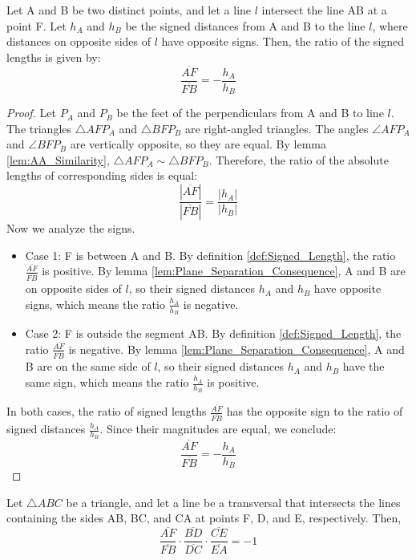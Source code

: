\begin{lemma}
    \label{lem:Segment_Ratio_by_Signed_Perpendiculars}
    Let A and B be two distinct points, and let a line $l$ intersect the line AB at a point F. Let $h_A$ and $h_B$ be the signed distances from A and B to the line $l$, where distances on opposite sides of $l$ have opposite signs. Then, the ratio of the signed lengths is given by:
    $$ \frac{\overline{AF}}{\overline{FB}} = -\frac{h_A}{h_B} $$
\end{lemma}

\begin{proof}
    Let $P_A$ and $P_B$ be the feet of the perpendiculars from A and B to line $l$. The triangles $\triangle AFP_A$ and $\triangle BFP_B$ are right-angled triangles. The angles $\angle AFP_A$ and $\angle BFP_B$ are vertically opposite, so they are equal. By lemma \ref{lem:AA_Similarity}, $\triangle AFP_A \sim \triangle BFP_B$. Therefore, the ratio of the absolute lengths of corresponding sides is equal:
    $$ \frac{|\overline{AF}|}{|\overline{FB}|} = \frac{|h_A|}{|h_B|} $$
    Now we analyze the signs.
    \begin{itemize}
        \item Case 1: F is between A and B. By definition \ref{def:Signed_Length}, the ratio $\frac{\overline{AF}}{\overline{FB}}$ is positive. By lemma \ref{lem:Plane_Separation_Consequence}, A and B are on opposite sides of $l$, so their signed distances $h_A$ and $h_B$ have opposite signs, which means the ratio $\frac{h_A}{h_B}$ is negative.
        \item Case 2: F is outside the segment AB. By definition \ref{def:Signed_Length}, the ratio $\frac{\overline{AF}}{\overline{FB}}$ is negative. By lemma \ref{lem:Plane_Separation_Consequence}, A and B are on the same side of $l$, so their signed distances $h_A$ and $h_B$ have the same sign, which means the ratio $\frac{h_A}{h_B}$ is positive.
    \end{itemize}
    In both cases, the ratio of signed lengths $\frac{\overline{AF}}{\overline{FB}}$ has the opposite sign to the ratio of signed distances $\frac{h_A}{h_B}$. Since their magnitudes are equal, we conclude:
    $$ \frac{\overline{AF}}{\overline{FB}} = -\frac{h_A}{h_B} $$
\end{proof}

\begin{theorem}
    \label{thm:Menelaus}
    Let $\triangle ABC$ be a triangle, and let a line be a transversal that intersects the lines containing the sides AB, BC, and CA at points F, D, and E, respectively. Then,
    $$ \frac{\overline{AF}}{\overline{FB}} \cdot \frac{\overline{BD}}{\overline{DC}} \cdot \frac{\overline{CE}}{\overline{EA}} = -1 $$
\end{theorem}

